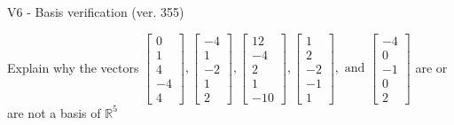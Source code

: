 \begin{exercise}
  \begin{exerciseTitle}V6 - Basis verification (ver. 355)\end{exerciseTitle}
  \begin{exerciseStatement}
    Explain why the vectors \(\left[\begin{array}{r}
0 \\
1 \\
4 \\
-4 \\
4
\end{array}\right] , \left[\begin{array}{r}
-4 \\
1 \\
-2 \\
1 \\
2
\end{array}\right] , \left[\begin{array}{r}
12 \\
-4 \\
2 \\
1 \\
-10
\end{array}\right] , \left[\begin{array}{r}
1 \\
2 \\
-2 \\
-1 \\
1
\end{array}\right] , \text{ and } \left[\begin{array}{r}
-4 \\
0 \\
-1 \\
0 \\
2
\end{array}\right]\) are or are not a basis of \(\mathbb{R}^5\)	



\end{exerciseStatement}
\end{exercise}
